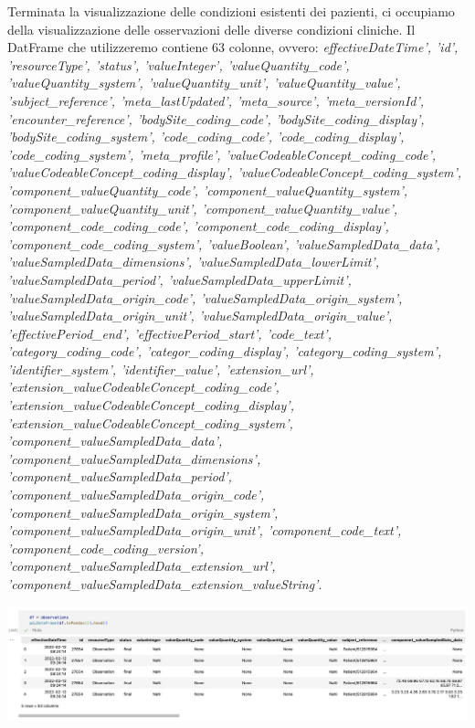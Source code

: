\documentclass[11pt, oneside]{article}
\begin{document}
Terminata la visualizzazione delle condizioni esistenti dei pazienti, ci occupiamo della visualizzazione delle osservazioni delle diverse condizioni cliniche. Il DatFrame che utilizzeremo contiene 63 colonne, ovvero: \emph{effectiveDateTime', 'id', 'resourceType', 'status', 'valueInteger', 'valueQuantity\_code', 'valueQuantity\_system', 'valueQuantity\_unit', 'valueQuantity\_value', 'subject\_reference', 'meta\_lastUpdated', 'meta\_source', 'meta\_versionId', 'encounter\_reference', 'bodySite\_coding\_code', 'bodySite\_coding\_display', 'bodySite\_coding\_system', 'code\_coding\_code', 'code\_coding\_display', 'code\_coding\_system', 'meta\_profile', 'valueCodeableConcept\_coding\_code', 'valueCodeableConcept\_coding\_display', 'valueCodeableConcept\_coding\_system', 'component\_valueQuantity\_code', 'component\_valueQuantity\_system', 'component\_valueQuantity\_unit', 'component\_valueQuantity\_value', 'component\_code\_coding\_code', 'component\_code\_coding\_display', 'component\_code\_coding\_system', 'valueBoolean', 'valueSampledData\_data', 'valueSampledData\_dimensions', 'valueSampledData\_lowerLimit', 'valueSampledData\_period', 'valueSampledData\_upperLimit', 'valueSampledData\_origin\_code', 'valueSampledData\_origin\_system', 'valueSampledData\_origin\_unit', 'valueSampledData\_origin\_value', 'effectivePeriod\_end', 'effectivePeriod\_start', 'code\_text', 'category\_coding\_code', 'categor\_coding\_display', 'category\_coding\_system', 'identifier\_system', 'identifier\_value', 'extension\_url', 'extension\_valueCodeableConcept\_coding\_code', 'extension\_valueCodeableConcept\_coding\_display', 'extension\_valueCodeableConcept\_coding\_system', 'component\_valueSampledData\_data', 'component\_valueSampledData\_dimensions', 'component\_valueSampledData\_period', 'component\_valueSampledData\_origin\_code', 'component\_valueSampledData\_origin\_system', 'component\_valueSampledData\_origin\_unit', 'component\_code\_text', 'component\_code\_coding\_version', 'component\_valueSampledData\_extension\_url', 'component\_valueSampledData\_extension\_valueString'}.

\begin{center}
\includegraphics[scale=0.45]{2_obs.png}
\end{center}
\end{document}
